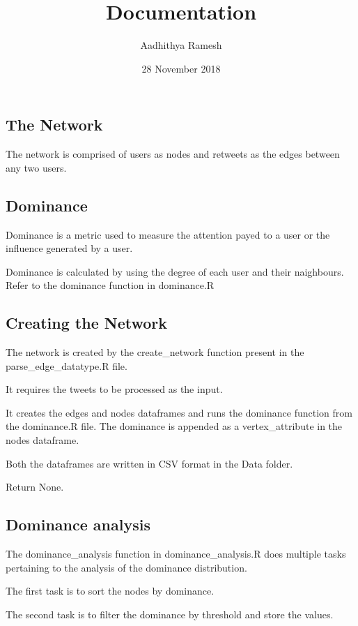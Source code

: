 \documentclass[]{article}
\title{Documentation}
\author{Aadhithya Ramesh}
\date{28 November 2018}
\begin{document}
\maketitle

\subsection{The Network}\label{the-network}

The network is comprised of users as nodes and retweets as the edges
between any two users.

\subsection{Dominance}\label{dominance}

Dominance is a metric used to measure the attention payed to a user or
the influence generated by a user.

Dominance is calculated by using the degree of each user and their
naighbours. Refer to the dominance function in dominance.R

\subsection{Creating the Network}\label{creating-the-network}

The network is created by the create\_network function present in the
parse\_edge\_datatype.R file.

It requires the tweets to be processed as the input.

It creates the edges and nodes dataframes and runs the dominance
function from the dominance.R file. The dominance is appended as a
vertex\_attribute in the nodes dataframe.

Both the dataframes are written in CSV format in the Data folder.

Return None.

\subsection{Dominance analysis}\label{dominance-analysis}

The dominance\_analysis function in dominance\_analysis.R does multiple
tasks pertaining to the analysis of the dominance distribution.

The first task is to sort the nodes by dominance.

The second task is to filter the dominance by threshold and store the
values.
\end{document}
